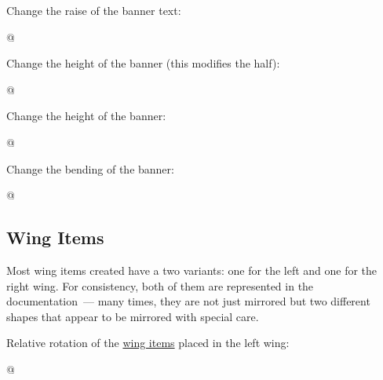 \documentclass[parskip=half,english,numbers=noenddot,footnotes=nomultiple,oneside]{scrartcl}
\begin{document}
Change the raise of the banner text:
\begin{tcblisting}{@}
\begin{tikzpicture}
	\pingu[banner, banner raise=2mm]
\end{tikzpicture}
\end{tcblisting}
\endsubkeyexplain

Change the height of the banner (this modifies the half):
\begin{tcblisting}{@}
\begin{tikzpicture}
	\pingu[banner, banner height=6mm]
\end{tikzpicture}
\end{tcblisting}
\endsubkeyexplain

Change the height of the banner:
\begin{tcblisting}{@}
\begin{tikzpicture}
	\pingu[banner, banner font=\itshape]
\end{tikzpicture}
\end{tcblisting}
\endsubkeyexplain

Change the bending of the banner:
\begin{tcblisting}{@}
\begin{tikzpicture}
	\pingu[banner, banner bent=0]
\end{tikzpicture}
\end{tcblisting}
\endsubkeyexplain

\subsection{Wing Items}
\label{sub:wing-items}Most wing items created have a two variants: one for the left and one for the right wing. For consistency, both of them are represented in the documentation~--- many times, they are not just mirrored but two different shapes that appear to be mirrored with special care.

	Relative rotation of the \hyperref[sub:wing-items]{wing items} placed in the left wing:
\begin{tcblisting}{@}
\begin{tikzpicture}
	\pingu[cane left, cane right,
	       left wing item angle=70]
\end{tikzpicture}
\end{tcblisting}
\endkeyexplain
\end{document}
